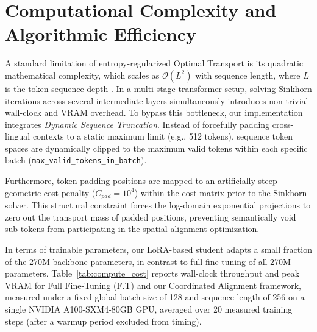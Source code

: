 \documentclass[11pt]{article}
\begin{document}
\section{Computational Complexity and Algorithmic Efficiency}
\label{sec:appendix_complexity}
A standard limitation of entropy-regularized Optimal Transport is its quadratic mathematical complexity, which scales as $\mathcal{O}(L^2)$ with sequence length, where $L$ is the token sequence depth \citep{cuturi2013sinkhorndistanceslightspeedcomputation}. In a multi-stage transformer setup, solving Sinkhorn iterations across several intermediate layers simultaneously introduces non-trivial wall-clock and VRAM overhead. To bypass this bottleneck, our implementation integrates \textit{Dynamic Sequence Truncation}. Instead of forcefully padding cross-lingual contexts to a static maximum limit (e.g., 512 tokens), sequence token spaces are dynamically clipped to the maximum valid tokens within each specific batch (\texttt{max\_valid\_tokens\_in\_batch}).

Furthermore, token padding positions are mapped to an artificially steep geometric cost penalty ($C_{pad} = 10^4$) within the cost matrix prior to the Sinkhorn solver. This structural constraint forces the log-domain exponential projections to zero out the transport mass of padded positions, preventing semantically void sub-tokens from participating in the spatial alignment optimization. 

In terms of trainable parameters, our LoRA-based student adapts a small fraction of the 270M backbone parameters, in contrast to full fine-tuning of all 270M parameters. Table~\ref{tab:compute_cost} reports wall-clock throughput and peak VRAM for Full Fine-Tuning (F.T) and our Coordinated Alignment framework, measured under a fixed global batch size of 128 and sequence length of 256 on a single NVIDIA A100-SXM4-80GB GPU, averaged over 20 measured training steps (after a warmup period excluded from timing).
\end{document}
